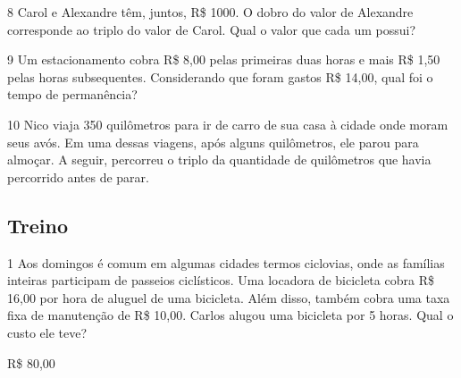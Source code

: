\begin{escolha}
\begin{boxmedio}
\begin{boxmedio}
{\begin{boxpeq}
\begin{boxpeq}
{\begin{boxpeq}
\begin{boxmedio}
\begin{boxmedio}
\begin{boxpeq}
\begin{boxmedio}
\begin{boxpeq}
\begin{boxpeq}
\begin{boxpeq}
\begin{boxpeq}
\begin{boxmedio}
{\begin{boxmedio}
\begin{boxmedio}
\begin{boxpeq}
\begin{boxmedio}

\num{8} Carol e Alexandre têm, juntos, R\$ 1000. O dobro do
valor de Alexandre corresponde ao triplo do valor de Carol. Qual o valor
que cada um possui?

\begin{boxpeq}


\num{9} Um estacionamento cobra R\$ 8,00 pelas primeiras duas horas e mais
R\$ 1,50 pelas horas subsequentes. Considerando que foram gastos R\$
14,00, qual foi o tempo de permanência?

\begin{boxpeq}


\num{10} Nico viaja 350 quilômetros para ir de carro de sua casa à cidade
onde moram seus avós. Em uma dessas viagens, após alguns quilômetros,
ele parou para almoçar. A seguir, percorreu o triplo da quantidade de
quilômetros que havia percorrido antes de parar.

\begin{boxpeq}


\section{Treino}

\num{1} Aos domingos é comum em algumas cidades termos ciclovias, onde as
famílias inteiras participam de passeios ciclísticos. Uma locadora de bicicleta
cobra R\$ 16,00 por hora de aluguel de uma bicicleta. Além disso,
também cobra uma taxa fixa de manutenção de R\$ 10,00. Carlos alugou uma
bicicleta por 5 horas. Qual o custo ele teve?

\begin{escolha}

  \item R\$ 80,00


\end{escolha}
\end{boxpeq}
\end{boxpeq}
\end{boxpeq}
\end{boxmedio}
\end{boxpeq}
\end{boxmedio}
\end{boxmedio}}
\end{boxmedio}
\end{boxpeq}
\end{boxpeq}
\end{boxpeq}
\end{boxpeq}
\end{boxmedio}
\end{boxpeq}
\end{boxmedio}
\end{boxmedio}
\end{boxpeq}}
\end{boxpeq}
\end{boxpeq}}
\end{boxmedio}
\end{boxmedio}
\end{escolha}

